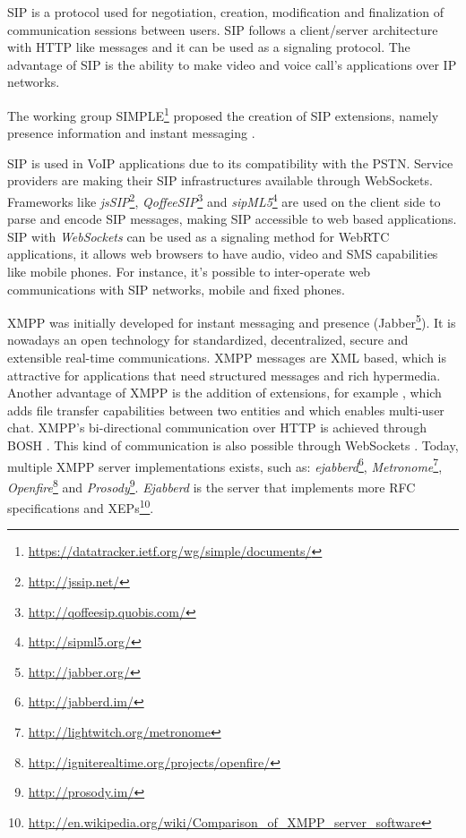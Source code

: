   \ac{SIP} \cite{rfc3261} is a protocol used for negotiation, creation, modification and finalization of communication sessions between users. \ac{SIP} follows a client/server architecture with \ac{HTTP} like messages and it can be used as a signaling protocol. The advantage of \ac{SIP} is the ability to make video and voice call's applications over \ac{IP} networks.

  The working group \ac{SIMPLE}\footnote{\url{https://datatracker.ietf.org/wg/simple/documents/}} proposed the creation of \ac{SIP} extensions, namely presence information \cite{rfc5263} and instant messaging \cite{rfc3428}.

  \ac{SIP} is used in \ac{VoIP} applications due to its compatibility with the \ac{PSTN}.
  Service providers are making their \ac{SIP} infrastructures available through WebSockets.
  Frameworks like \emph{jsSIP}\footnote{\url{http://jssip.net/}}, \emph{QoffeeSIP}\footnote{\url{http://qoffeesip.quobis.com/}} and \emph{sipML5}\footnote{\url{http://sipml5.org/}} are used on the client side to parse and encode \ac{SIP} messages, making \ac{SIP} accessible to web based applications. 
  \ac{SIP} with \emph{WebSockets} can be used as a signaling method for \ac{WebRTC} applications, it allows web browsers to have audio, video and \ac{SMS} capabilities like mobile phones. For instance, it's possible to inter-operate web communications with \ac{SIP} networks, mobile and fixed phones.

  \ac{XMPP} was initially developed for instant messaging and presence (Jabber\footnote{\url{http://jabber.org/}}). It is nowadays an open technology for standardized, decentralized, secure and extensible real-time communications. 
  \ac{XMPP} messages are \ac{XML} based, which is attractive for applications that need structured messages and rich hypermedia. Another advantage of \ac{XMPP} is the addition of extensions, for example \cite{xep0096}, which adds file transfer capabilities between two entities and \cite{xep0045} which enables multi-user chat.
  \ac{XMPP}'s bi-directional communication over \ac{HTTP} is achieved through \ac{BOSH} \cite{xep0206}.
  This kind of communication is also possible through WebSockets \cite{rfc7395}.
  Today, multiple XMPP server implementations exists, such as: \emph{ejabberd}\footnote{\url{http://jabberd.im/}}, \emph{Metronome}\footnote{\url{http://lightwitch.org/metronome}}, \emph{Openfire}\footnote{\url{http://igniterealtime.org/projects/openfire/}} and \emph{Prosody}\footnote{\url{http://prosody.im/}}. \emph{Ejabberd} is the server that implements more \ac{RFC} specifications and \ac{XEP}s\footnote{\url{http://en.wikipedia.org/wiki/Comparison_of_XMPP_server_software}}.
  
